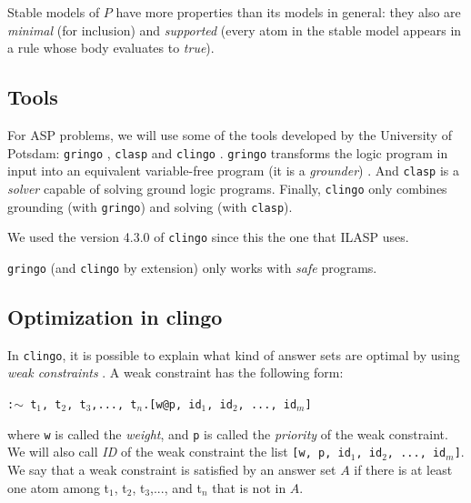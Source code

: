 \smallskip

Stable models of $P$ have more properties than its models in general: they also are \textit{minimal} (for inclusion) and \textit{supported} \citep{sergot_stable_model} (every atom in the stable model appears in a rule whose body evaluates to \textit{true}). 

\subsection{Tools}

For ASP problems, we will use some of the tools developed by the University of Potsdam: \texttt{gringo} \citep{gringo_paper}, \texttt{clasp} \citep{clasp} and \texttt{clingo} \citep{clingo_paper}. \texttt{gringo} transforms the logic program in input into an equivalent variable-free program (it is a \textit{grounder}) \citep{manual_clingo}. And \texttt{clasp} is a \textit{solver} capable of solving ground logic programs. Finally, \texttt{clingo} only combines grounding (with \texttt{gringo}) and solving (with \texttt{clasp}). 

\smallskip

We used the version 4.3.0 of \texttt{clingo} since this the one that ILASP uses.

\smallskip

\begin{remark}
\texttt{gringo} (and \texttt{clingo} by extension) only works with \textit{safe} programs. \citep{manual_clingo}
\end{remark}

\subsection{Optimization in clingo}\label{subseq:optimization}

In \texttt{clingo}, it is possible to explain what kind of answer sets are optimal by using \textit{weak constraints} \citep{manual_clingo}. A weak constraint has the following form:
\begin{center}
\texttt{:$\sim$ t$_1$, t$_2$, t$_3$,..., t$_n$.[w@p, id$_1$, id$_2$, ..., id$_m$]}
\end{center}
where \texttt{w} is called the \textit{weight}, and \texttt{p} is called the \textit{priority} of the weak constraint. We will also call \textit{ID} of the weak constraint the list \texttt{[\texttt{w}, \texttt{p}, id$_1$, id$_2$, ..., id$_m$]}. We say that a weak constraint is satisfied by an answer set $A$ if there is at least one atom among t$_1$, t$_2$, t$_3$,..., and t$_n$ that is not in $A$.

